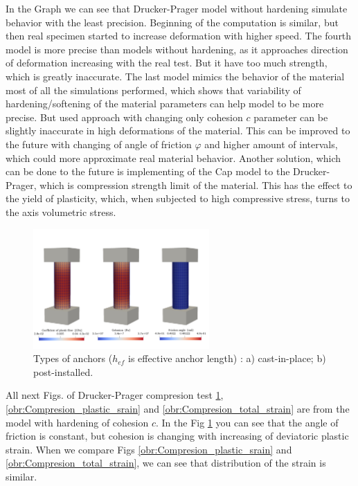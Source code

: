 In the Graph we can see that Drucker-Prager model without hardening simulate behavior with the least precision. Beginning of the computation is similar, but then real specimen started to increase deformation with higher speed. The fourth model is more precise than models without hardening, as it approaches direction of deformation increasing with the real test. But it have too much strength, which is greatly inaccurate. The last model mimics the behavior of the material most of all the simulations performed, which shows that variability of hardening/softening of the material parameters can help model to be more precise. But used approach with changing only cohesion $c$ parameter can be slightly inaccurate in high deformations of the material. This can be improved to the future with changing of angle of friction $\varphi$ and higher amount of intervals, which could more approximate real material behavior. Another solution, which can be done to the future is implementing of the Cap model to the Drucker-Prager, which is compression strength limit of the material. This has the effect to the yield of plasticity, which, when subjected to high compressive stress, turns to the axis volumetric stress. 



\begin{figure}[h!]
	\centering
	\includegraphics[width=0.6\textwidth]{obrazky/compression_zpevneni_parametry.png}
	\caption[Types of anchors]{Types of anchors ($h_{ef}$ is effective anchor length) \cite{anchors-ACI-318M}: a) cast-in-place; b) post-installed.}\label{obr:Compresion_parameters}
\end{figure}

All next Figs. of Drucker-Prager compresion test \ref{obr:Compresion_parameters}, \ref{obr:Compresion_plastic_srain} and \ref{obr:Compresion_total_strain} are from the model with hardening of cohesion $c$. In the Fig \ref{obr:Compresion_parameters} you can see that the angle of friction is constant, but cohesion is changing with increasing of deviatoric plastic strain. When we compare Figs \ref{obr:Compresion_plastic_srain} and \ref{obr:Compresion_total_strain}, we can see that distribution of the strain is similar.



